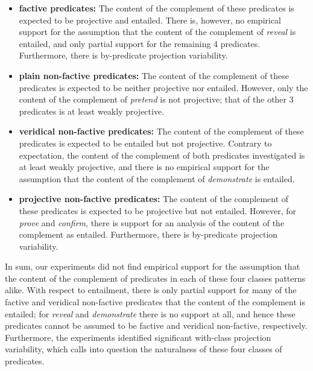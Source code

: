 \documentclass[11pt,fleqn]{article}
\newcommand{\6}{\mbox{$[\hspace*{-.6mm}[$}}
\newcommand{\9}{\mbox{$]\hspace*{-.6mm}]$}}
\begin{document}
{\begin{itemize}[topsep=-1pt,itemsep=1pt]

\item {\bf factive predicates:} The content of the complement of these predicates is expected to be projective and entailed. There is, however, no empirical support for the assumption that the content of the complement of {\em reveal} is entailed, and only partial support for the remaining 4 predicates. Furthermore, there is by-predicate projection variability.

\item {\bf plain non-factive predicates:} The content of the complement of these predicates is expected to be neither projective nor entailed. However, only the content of the complement of {\em pretend} is not projective; that of the other 3 predicates is at least weakly projective.

\item {\bf veridical non-factive predicates:} The content of the complement of these predicates is expected to be entailed but not projective. Contrary to expectation, the content of the complement of both predicates investigated is at least weakly projective, and there is no empirical support for the assumption that the content of the complement of {\em demonstrate} is entailed. 

\item {\bf projective non-factive predicates:} The content of the complement of these predicates is expected to be projective but not entailed. However, for {\em prove} and {\em confirm}, there is support for an analysis of the content of the complement as entailed. Furthermore, there is by-predicate projection variability.

\end{itemize}

In sum, our experiments did not find empirical support for the assumption that the content of the complement of predicates in each of these four classes patterns alike. With respect to entailment, there is only partial support for many of the factive and veridical non-factive predicates that the content of the complement is entailed; for {\em reveal} and {\em demonstrate} there is no support at all, and hence these predicates cannot be assumed to be factive and veridical non-factive, respectively. Furthermore, the experiments identified significant with-class projection variability, which calls into question the naturalness of these four classes of predicates. 

}
\end{document}
